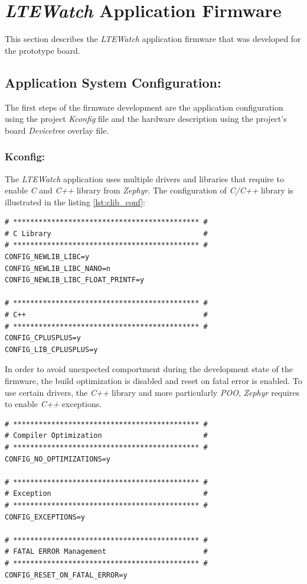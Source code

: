 \documentclass[report.tex]{subfiles}
\begin{document}
\section{\textit{LTEWatch} Application Firmware}
This section describes the \textit{LTEWatch} application firmware that was developed for the prototype board.

\subsection{Application System Configuration:}
The first steps of the firmware development are the application configuration using the project \textit{Kconfig} file and the hardware description using the project's board \textit{Devicetree} overlay file.

\subsubsection{Kconfig:}

The \textit{LTEWatch} application uses multiple drivers and libraries that require to enable \textit{C} and \textit{C++} library from \textit{Zephyr}. The configuration of \textit{C/C++} library is illustrated in the listing \ref{lst:clib_conf}:

\begin{lstlisting}[style=console,label={lst:clib_conf},caption={Application \textit{C} library Configuration}]
# ******************************************** #
# C Library                                    #
# ******************************************** #
CONFIG_NEWLIB_LIBC=y
CONFIG_NEWLIB_LIBC_NANO=n
CONFIG_NEWLIB_LIBC_FLOAT_PRINTF=y

# ******************************************** #
# C++                                          #
# ******************************************** #
CONFIG_CPLUSPLUS=y
CONFIG_LIB_CPLUSPLUS=y
\end{lstlisting}

In order to avoid unexpected comportment during the development state of the firmware, the build optimization is disabled and reset on fatal error is enabled. To use certain drivers, the \textit{C++} library and more particularly \textit{POO}, \textit{Zephyr} requires to enable \textit{C++} exceptions.

\begin{lstlisting}[style=console,label={lst:sys_conf},caption={Application System Configuration}]
# ******************************************** #
# Compiler Optimization                        #
# ******************************************** #
CONFIG_NO_OPTIMIZATIONS=y

# ******************************************** #
# Exception                                    #
# ******************************************** #
CONFIG_EXCEPTIONS=y

# ******************************************** #
# FATAL ERROR Management                       #
# ******************************************** #
CONFIG_RESET_ON_FATAL_ERROR=y
\end{lstlisting}
\end{document}
